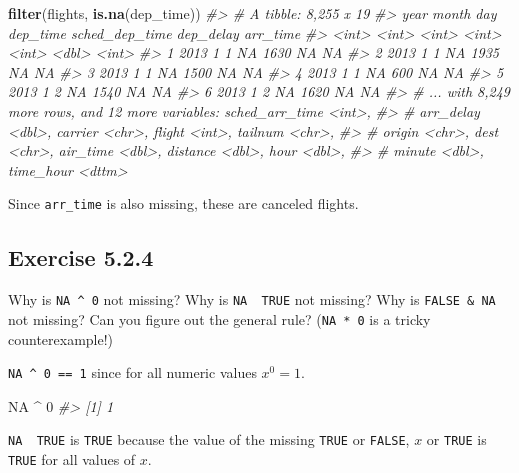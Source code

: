 \documentclass[]{book}
\newenvironment{Shaded}{\begin{snugshade}}{\end{snugshade}}
\newcommand{\CommentTok}[1]{\textcolor[rgb]{0.56,0.35,0.01}{\textit{#1}}}
\newcommand{\DecValTok}[1]{\textcolor[rgb]{0.00,0.00,0.81}{#1}}
\newcommand{\KeywordTok}[1]{\textcolor[rgb]{0.13,0.29,0.53}{\textbf{#1}}}
\newcommand{\NormalTok}[1]{#1}
\newcommand{\OperatorTok}[1]{\textcolor[rgb]{0.81,0.36,0.00}{\textbf{#1}}}
\newcommand{\OtherTok}[1]{\textcolor[rgb]{0.56,0.35,0.01}{#1}}
\newcommand{\StringTok}[1]{\textcolor[rgb]{0.31,0.60,0.02}{#1}}
\theoremstyle{plain}
\theoremstyle{remark}
\begin{document}
\begin{Shaded}
\begin{Highlighting}[]
\KeywordTok{filter}\NormalTok{(flights, }\KeywordTok{is.na}\NormalTok{(dep_time))}
\CommentTok{#> # A tibble: 8,255 x 19}
\CommentTok{#>    year month   day dep_time sched_dep_time dep_delay arr_time}
\CommentTok{#>   <int> <int> <int>    <int>          <int>     <dbl>    <int>}
\CommentTok{#> 1  2013     1     1       NA           1630        NA       NA}
\CommentTok{#> 2  2013     1     1       NA           1935        NA       NA}
\CommentTok{#> 3  2013     1     1       NA           1500        NA       NA}
\CommentTok{#> 4  2013     1     1       NA            600        NA       NA}
\CommentTok{#> 5  2013     1     2       NA           1540        NA       NA}
\CommentTok{#> 6  2013     1     2       NA           1620        NA       NA}
\CommentTok{#> # ... with 8,249 more rows, and 12 more variables: sched_arr_time <int>,}
\CommentTok{#> #   arr_delay <dbl>, carrier <chr>, flight <int>, tailnum <chr>,}
\CommentTok{#> #   origin <chr>, dest <chr>, air_time <dbl>, distance <dbl>, hour <dbl>,}
\CommentTok{#> #   minute <dbl>, time_hour <dttm>}
\end{Highlighting}
\end{Shaded}

Since \texttt{arr\_time} is also missing, these are canceled flights.

\hypertarget{exercise-5.2.4}{%
\subsection*{\texorpdfstring{Exercise
{5.2.4}}{Exercise 5.2.4}}\label{exercise-5.2.4}}

Why is \texttt{NA\ \^{}\ 0} not missing? Why is
\texttt{NA\ \textbar{}\ TRUE} not missing? Why is \texttt{FALSE\ \&\ NA}
not missing? Can you figure out the general rule? (\texttt{NA\ *\ 0} is
a tricky counterexample!)

\texttt{NA\ \^{}\ 0\ ==\ 1} since for all numeric values \(x ^ 0 = 1\).

\begin{Shaded}
\begin{Highlighting}[]
\OtherTok{NA} \OperatorTok{^}\StringTok{ }\DecValTok{0}
\CommentTok{#> [1] 1}
\end{Highlighting}
\end{Shaded}

\texttt{NA\ \textbar{}\ TRUE} is \texttt{TRUE} because the value of the
missing \texttt{TRUE} or \texttt{FALSE}, \(x\) or \texttt{TRUE} is
\texttt{TRUE} for all values of \(x\).
\end{document}
